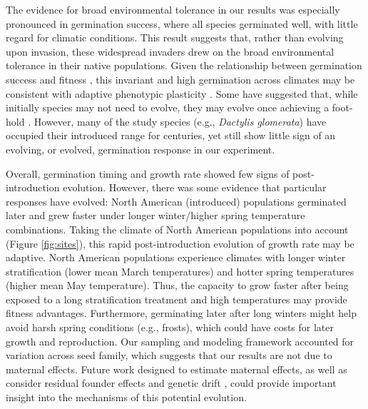 \documentclass[11pt]{article}\usepackage[]{graphicx}\usepackage[]{color}
\begin{document}
	The evidence for broad environmental tolerance in our results was especially pronounced in germination success, where all species germinated well, with little regard for climatic conditions. This result suggests that, rather than evolving upon invasion, these widespread invaders drew on the broad environmental tolerance in their native populations. Given the relationship between germination success and fitness \parencite[e.g.,][]{Domic2020}, this invariant and high germination across climates may be consistent with adaptive phenotypic plasticity \parencite{Baker1965}. Some have suggested that, while initially species may not need to evolve, they may evolve once achieving a foot-hold \parencite{Lamarque2015}. However, many of the study species (e.g., \textit{Dactylis glomerata}) have occupied their introduced range for centuries, yet still show little sign of an evolving, or evolved, germination response in our experiment. 

	Overall, germination timing and growth rate showed few signs of post-introduction evolution. However, there was some evidence that particular responses have evolved: North American (introduced) populations germinated later and grew faster under longer winter/higher spring temperature combinations. Taking the climate of North American populations into account (Figure \ref{fig:sites}), this rapid post-introduction evolution of growth rate may be adaptive. North American populations experience climates with longer winter stratification  (lower mean March temperatures) and hotter spring temperatures (higher mean May temperature). Thus, the capacity to grow faster after being exposed to a long stratification treatment and high temperatures may provide fitness advantages. Furthermore, germinating later after long winters might help avoid harsh spring conditions  (e.g., frosts), which could have costs for later growth and reproduction.  Our sampling and modeling framework accounted for variation across seed family, which suggests that our results are not due to maternal effects. Future work designed to estimate maternal effects, as well as consider residual founder effects \parencite{Shirk2014} and genetic drift \parencite{Eckert1996}, could provide important insight into the mechanisms of this potential evolution. %
\end{document}

